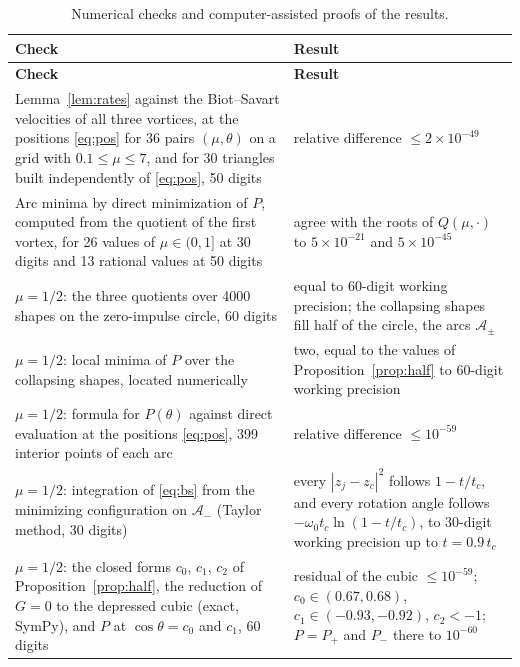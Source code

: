 \documentclass[11pt]{article}
\theoremstyle{definition}
\newcommand{\Am}{\mathcal{A}_-}
\begin{document}
{\small
\renewcommand{\arraystretch}{1.2}
\begin{longtable}{|>{\raggedright\arraybackslash}p{}|>{\raggedright\arraybackslash}p{}|}
\caption{Numerical checks and computer-assisted proofs of the results.}\label{tab:checks}\\
  \hline
  \textbf{Check} & \textbf{Result} \\ \hline
  \endfirsthead
  \hline
  \textbf{Check} & \textbf{Result} \\ \hline
  \endhead
  Lemma~\ref{lem:rates} against the Biot--Savart velocities of all three vortices, at the positions \eqref{eq:pos} for 36 pairs $(\mu, \theta)$ on a grid with $0.1 \le \mu \le 7$, and for 30 triangles built independently of \eqref{eq:pos}, 50 digits
    & relative difference $\le 2 \times 10^{-49}$ \\ \hline
  Arc minima by direct minimization of $P$, computed from the quotient of the first vortex, for 26 values of $\mu \in (0, 1]$ at 30 digits and 13 rational values at 50 digits
    & agree with the roots of $Q(\mu, \cdot)$ to $5 \times 10^{-21}$ and $5 \times 10^{-45}$ \\ \hline
  $\mu = 1/2$: the three quotients over 4000 shapes on the zero-impulse circle, 60 digits
    & equal to 60-digit working precision; the collapsing shapes fill half of the circle, the arcs $\mathcal{A}_\pm$ \\ \hline
  $\mu = 1/2$: local minima of $P$ over the collapsing shapes, located numerically
    & two, equal to the values of Proposition~\ref{prop:half} to 60-digit working precision \\ \hline
  $\mu = 1/2$: formula for $P(\theta)$ against direct evaluation at the positions \eqref{eq:pos}, 399 interior points of each arc
    & relative difference $\le 10^{-59}$ \\ \hline
  $\mu = 1/2$: integration of \eqref{eq:bs} from the minimizing configuration on $\Am$ (Taylor method, 30 digits)
    & every $|z_j - z_c|^2$ follows $1 - t/t_c$, and every rotation angle follows $-\omega_0 t_c \ln(1 - t/t_c)$, to 30-digit working precision up to $t = 0.9\, t_c$ \\ \hline
  $\mu = 1/2$: the closed forms $c_0$, $c_1$, $c_2$ of Proposition~\ref{prop:half}, the reduction of $G = 0$ to the depressed cubic (exact, SymPy), and $P$ at $\cos\theta = c_0$ and $c_1$, 60 digits
    & residual of the cubic $\le 10^{-59}$; $c_0 \in (0.67, 0.68)$, $c_1 \in (-0.93, -0.92)$, $c_2 < -1$; $P = P_+$ and $P_-$ there to $10^{-60}$ \\ \hline

\end{longtable}}
\end{document}

